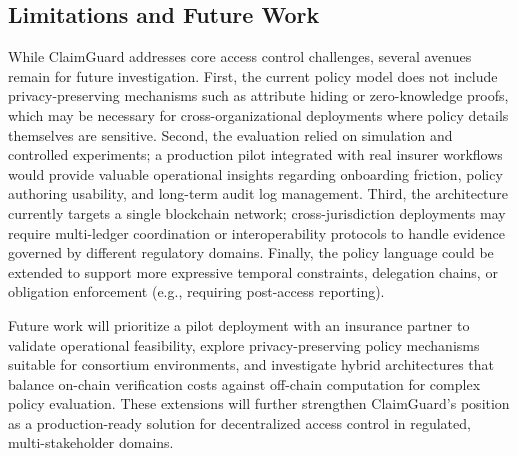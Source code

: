 \documentclass[final,5p,times,twocolumn]{elsarticle}
\begin{document}
\subsection{Limitations and Future Work}

While ClaimGuard addresses core access control challenges, several avenues remain for future investigation. First, the current policy model does not include privacy-preserving mechanisms such as attribute hiding or zero-knowledge proofs, which may be necessary for cross-organizational deployments where policy details themselves are sensitive. Second, the evaluation relied on simulation and controlled experiments; a production pilot integrated with real insurer workflows would provide valuable operational insights regarding onboarding friction, policy authoring usability, and long-term audit log management. Third, the architecture currently targets a single blockchain network; cross-jurisdiction deployments may require multi-ledger coordination or interoperability protocols to handle evidence governed by different regulatory domains. Finally, the policy language could be extended to support more expressive temporal constraints, delegation chains, or obligation enforcement (e.g., requiring post-access reporting).

Future work will prioritize a pilot deployment with an insurance partner to validate operational feasibility, explore privacy-preserving policy mechanisms suitable for consortium environments, and investigate hybrid architectures that balance on-chain verification costs against off-chain computation for complex policy evaluation. These extensions will further strengthen ClaimGuard's position as a production-ready solution for decentralized access control in regulated, multi-stakeholder domains.










\end{document}

